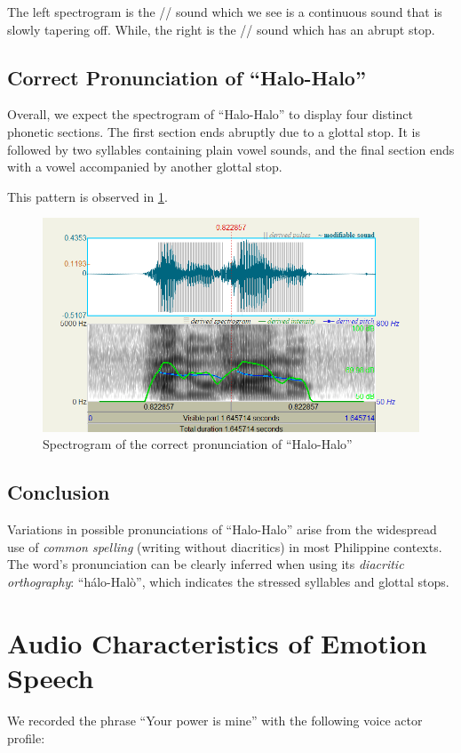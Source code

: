 \documentclass{article}
\begin{document}
The left spectrogram is the // sound which we see is a continuous
sound that is slowly tapering off. While, the right is the // sound
which has an abrupt stop.

\subsection{Correct Pronunciation of ``Halo-Halo''}
Overall, we expect the spectrogram of ``Halo-Halo'' to display four distinct
phonetic sections. The first section ends abruptly due to a glottal stop. It is
followed by two syllables containing plain vowel sounds, and the final section
ends with a vowel accompanied by another glottal stop.

This pattern is observed in \cref{fig:correct}.

\begin{figure}
    \centering
    \includegraphics[width=0.65\linewidth]{img/correct.png}
    \caption{Spectrogram of the correct pronunciation of ``Halo-Halo''}\label{fig:correct}
\end{figure}

\subsection{Conclusion}

Variations in possible pronunciations of ``Halo-Halo'' arise from the
widespread use of \emph{common spelling} (writing without diacritics) in most
Philippine contexts. The word's pronunciation can be clearly inferred when
using its \emph{diacritic orthography}: ``h\'alo-Hal\`o'', which indicates the
stressed syllables and glottal stops.

\section{Audio Characteristics of Emotion Speech}

We recorded the phrase ``Your power is mine'' with the following voice actor
profile:
\end{document}
